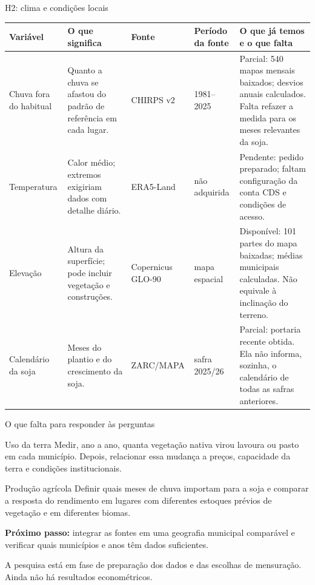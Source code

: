 \documentclass[aspectratio=169,11pt]{beamer}
\newcommand{\fonte}[1]{\par\vfill{\fontsize{7.5}{9}\selectfont\color{gray}#1\par}}
\newcommand{\disp}{\textcolor{azul}{Disponível}}
\newcommand{\parcial}{\textcolor{orange!75!black}{Parcial}}
\newcommand{\pend}{\textcolor{red!70!black}{Pendente}}
\begin{document}
\begin{frame}{H2: clima e condições locais}
\fontsize{9}{11}\selectfont
\setlength{\tabcolsep}{3pt}
\begin{tabularx}{\textwidth}{P{1.9cm} P{3.0cm} P{2.1cm} P{1.7cm} X}
\toprule
\textbf{Variável} & \textbf{O que significa} & \textbf{Fonte} & \textbf{Período da fonte} & \textbf{O que já temos e o que falta} \\
\midrule
Chuva fora do habitual & Quanto a chuva se afastou do padrão de referência em cada lugar. & CHIRPS v2 & 1981--2025 & \parcial: 540 mapas mensais baixados; desvios anuais calculados. Falta refazer a medida para os meses relevantes da soja. \\
Temperatura & Calor médio; extremos exigiriam dados com detalhe diário. & ERA5-Land & não adquirida & \pend: pedido preparado; faltam configuração da conta CDS e condições de acesso. \\
Elevação & Altura da superfície; pode incluir vegetação e construções. & Copernicus GLO-90 & mapa espacial & \disp: 101 partes do mapa baixadas; médias municipais calculadas. Não equivale à inclinação do terreno. \\
Calendário da soja & Meses do plantio e do crescimento da soja. & ZARC/MAPA & safra 2025/26 & \parcial: portaria recente obtida. Ela não informa, sozinha, o calendário de todas as safras anteriores. \\
\bottomrule
\end{tabularx}
\end{frame}

\begin{frame}{O que falta para responder às perguntas}
\begin{block}{Uso da terra}
Medir, ano a ano, quanta vegetação nativa virou lavoura ou pasto em cada município. Depois, relacionar essa mudança a preços, capacidade da terra e condições institucionais.
\end{block}
\medskip
\begin{block}{Produção agrícola}
Definir quais meses de chuva importam para a soja e comparar a resposta do rendimento em lugares com diferentes estoques prévios de vegetação e em diferentes biomas.
\end{block}
\medskip
\textbf{Próximo passo:} integrar as fontes em uma geografia municipal comparável e verificar quais municípios e anos têm dados suficientes.
\fonte{A pesquisa está em fase de preparação dos dados e das escolhas de mensuração. Ainda não há resultados econométricos.}
\end{frame}
\end{document}
